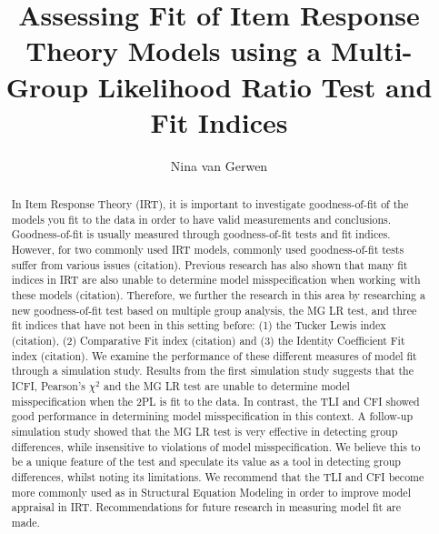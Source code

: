 \documentclass[Royal,sageapa,times,doublespace]{sagej}
\begin{document}

\title{Assessing Fit of Item Response Theory Models using a Multi-Group Likelihood Ratio Test and Fit Indices}

\author{Nina van Gerwen } %




\begin{abstract}
In Item Response Theory (IRT), it is important to investigate goodness-of-fit of the models you fit to the data in order to have valid measurements and conclusions. Goodness-of-fit is usually measured through goodness-of-fit tests and fit indices. However, for two commonly used IRT models, commonly used goodness-of-fit tests suffer from various issues (citation). Previous research has also shown that many fit indices in IRT are also unable to determine model misspecification when working with these models (citation). Therefore, we further the research in this area by researching a new goodness-of-fit test based on multiple group analysis, the MG LR test, and three fit indices that have not been in this setting before: (1) the Tucker Lewis index (citation), (2) Comparative Fit index (citation) and (3) the Identity Coefficient Fit index (citation). We examine the performance of these different measures of model fit through a simulation study. Results from the first simulation study suggests that the ICFI, Pearson's $\chi^2$ and the MG LR test are unable to determine model misspecification when the 2PL is fit to the data. In contrast, the TLI and CFI showed good performance in determining model misspecification in this context. A follow-up simulation study showed that the MG LR test is very effective in detecting group differences, while insensitive to violations of model misspecification. We believe this to be a unique feature of the test and speculate its value as a tool in detecting group differences, whilst noting its limitations. We recommend that the TLI and CFI become more commonly used as in Structural Equation Modeling in order to improve model appraisal in IRT. Recommendations for future research in measuring model fit are made. 

\end{abstract}
\end{document}
